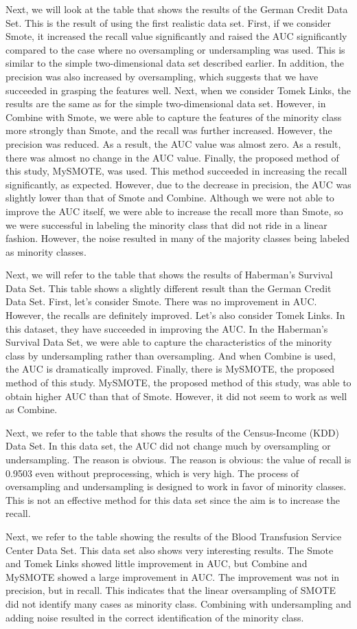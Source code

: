 Next, we will look at the table that shows the results of the German Credit Data Set.
This is the result of using the first realistic data set.
First, if we consider Smote, it increased the recall value significantly and raised the AUC significantly compared to the case where no oversampling or undersampling was used.
This is similar to the simple two-dimensional data set described earlier.
In addition, the precision was also increased by oversampling, which suggests that we have succeeded in grasping the features well.
Next, when we consider Tomek Links, the results are the same as for the simple two-dimensional data set.
However, in Combine with Smote, we were able to capture the features of the minority class more strongly than Smote, and the recall was further increased.
However, the precision was reduced. As a result, the AUC value was almost zero. As a result, there was almost no change in the AUC value.
Finally, the proposed method of this study, MySMOTE, was used. This method succeeded in increasing the recall significantly, as expected.
However, due to the decrease in precision, the AUC was slightly lower than that of Smote and Combine.
Although we were not able to improve the AUC itself, we were able to increase the recall more than Smote, so we were successful in labeling the minority class that did not ride in a linear fashion.
However, the noise resulted in many of the majority classes being labeled as minority classes.

Next, we will refer to the table that shows the results of Haberman's Survival Data Set.
This table shows a slightly different result than the German Credit Data Set.
First, let's consider Smote. There was no improvement in AUC. However, the recalls are definitely improved.
Let's also consider Tomek Links. In this dataset, they have succeeded in improving the AUC.
In the Haberman's Survival Data Set, we were able to capture the characteristics of the minority class by undersampling rather than oversampling.
And when Combine is used, the AUC is dramatically improved.
Finally, there is MySMOTE, the proposed method of this study. MySMOTE, the proposed method of this study, was able to obtain higher AUC than that of Smote. However, it did not seem to work as well as Combine.

Next, we refer to the table that shows the results of the Census-Income (KDD) Data Set.
In this data set, the AUC did not change much by oversampling or undersampling.
The reason is obvious. The reason is obvious: the value of recall is 0.9503 even without preprocessing, which is very high.
The process of oversampling and undersampling is designed to work in favor of minority classes. This is not an effective method for this data set since the aim is to increase the recall.

Next, we refer to the table showing the results of the Blood Transfusion Service Center Data Set.
This data set also shows very interesting results.
The Smote and Tomek Links showed little improvement in AUC, but Combine and MySMOTE showed a large improvement in AUC.
The improvement was not in precision, but in recall.
This indicates that the linear oversampling of SMOTE did not identify many cases as minority class.
Combining with undersampling and adding noise resulted in the correct identification of the minority class.
